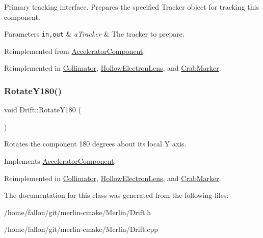 Primary tracking interface. Prepares the specified Tracker object for tracking this component. 
\begin{DoxyParams}[1]{Parameters}
\mbox{\tt in,out}  & {\em a\+Tracker} & The tracker to prepare. \\
\hline
\end{DoxyParams}


Reimplemented from \hyperlink{classAcceleratorComponent_ab897c54689ac946f40c3ad0716ddd4bb}{Accelerator\+Component}.



Reimplemented in \hyperlink{classCollimator_acbcf691bfcf53d652d14b9381c711fe7}{Collimator}, \hyperlink{classHollowElectronLens_a86e8e69936f636a5d3fa0675e0434bf4}{Hollow\+Electron\+Lens}, and \hyperlink{classCrabMarker_ab29822625603a198dc7623979ed1bb3b}{Crab\+Marker}.

\mbox{\label{classDrift_abf387eddfcabfc81b186080f6301ce60}} 
\subsubsection{\texorpdfstring{Rotate\+Y180()}{RotateY180()}}
{\footnotesize\ttfamily void Drift\+::\+Rotate\+Y180 (\begin{DoxyParamCaption}{ }\end{DoxyParamCaption})\hspace{0.3cm}{\ttfamily [virtual]}}

Rotates the component 180 degrees about its local Y axis. 

Implements \hyperlink{classAcceleratorComponent_a8bf0d39b56578ca99f286ca1504b9072}{Accelerator\+Component}.



Reimplemented in \hyperlink{classCollimator_a89d782779f8e57af28eeb963078bbf20}{Collimator}, \hyperlink{classHollowElectronLens_a8e806750ac6f8129d3be4a089303da36}{Hollow\+Electron\+Lens}, and \hyperlink{classCrabMarker_a4b60620517f65b4e1f557300a3dbe89b}{Crab\+Marker}.



The documentation for this class was generated from the following files\+:\begin{DoxyCompactItemize}
\item 
/home/fallon/git/merlin-\/cmake/\+Merlin/Drift.\+h\item 
/home/fallon/git/merlin-\/cmake/\+Merlin/Drift.\+cpp\end{DoxyCompactItemize}
